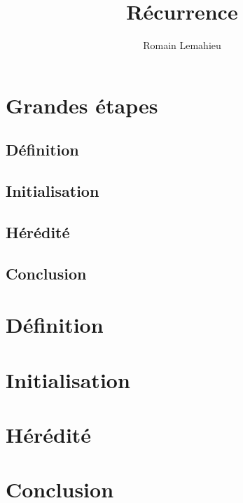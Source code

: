 \documentclass{exam}
\title{Récurrence}
\author{Romain Lemahieu}
\begin{document}
\maketitle
\section{Grandes étapes}
\subsection{Définition}
\subsection{Initialisation}
\subsection{Hérédité}
\subsection{Conclusion}
\section{Définition}
\section{Initialisation}
\section{Hérédité}
\section{Conclusion}
\end{document}
